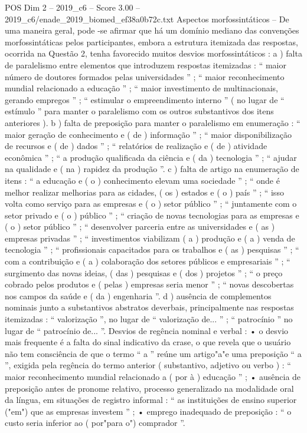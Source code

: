 \begin{textsample}{POS Dim 2 – 2019\_c6 – Score 3.00 – 2019\_c6/enade\_2019\_biomed\_ef38a0b72c.txt}
Aspectos morfossintáticos – De uma maneira geral, pode -se afirmar que há um domínio mediano das convenções morfossintáticas pelos participantes, embora a estrutura itemizada das respostas, ocorrida na Questão 2, tenha favorecido muitos desvios morfossintáticos : a ) falta de paralelismo entre elementos que introduzem respostas itemizadas : “ maior número de doutores formados pelas universidades ” ; “ maior reconhecimento mundial relacionado a educação ” ; “ maior investimento de multinacionais, gerando empregos ” ; “ estimular o empreendimento interno ” ( no lugar de “ estímulo ” para manter o paralelismo com os outros substantivos dos itens anteriores ). b ) falta de preposição para manter o paralelismo em enumeração : “ maior geração de conhecimento e ( de ) informação ” ; “ maior disponibilização de recursos e ( de ) dados ” ; “ relatórios de realização e ( de ) atividade econômica ” ; “ a produção qualificada da ciência e ( da ) tecnologia ” ; “ ajudar na qualidade e ( na ) rapidez da produção ”. c ) falta de artigo na enumeração de itens : “ a educação e ( o ) conhecimento elevam uma sociedade ” ; “ onde é melhor realizar melhorias para as cidades, ( os ) estados e ( o ) país ” ; “ isso volta como serviço para as empresas e ( o ) setor público ” ; “ juntamente com o setor privado e ( o ) público ” ; “ criação de novas tecnologias para as empresas e ( o ) setor público ” ; “ desenvolver parceria entre as universidades e ( as ) empresas privadas ” ; “ investimentos viabilizam ( a ) produção e ( a ) venda de tecnologia ” ; “ profissionais capacitados para os trabalhos e ( as ) pesquisas ” ; “ com a contribuição e ( a ) colaboração dos setores públicos e empresariais ” ; “ surgimento das novas ideias, ( das ) pesquisas e ( dos ) projetos ” ; “ o preço cobrado pelos produtos e ( pelas ) empresas seria menor ” ; “ novas descobertas nos campos da saúde e ( da ) engenharia ”. d ) ausência de complementos nominais junto a substantivos abstratos deverbais, principalmente nas respostas itemizadas : “ valorização ”, no lugar de “ valorização de... ” ; “ patrocínio ” no lugar de “ patrocínio de... ”.
Desvios de regência nominal e verbal : • o desvio mais frequente é a falta do sinal indicativo da crase, o que revela que o usuário não tem consciência de que o termo “ a ” reúne um artigo"a"e uma preposição “ a ”, exigida pela regência do termo anterior ( substantivo, adjetivo ou verbo ) : “ maior reconhecimento mundial relacionado a ( por à ) educação ” ; • ausência de preposição antes de pronome relativo, processo generalizado na modalidade oral da língua, em situações de registro informal : “ as instituições de ensino superior ("em") que as empresas investem ” ; • emprego inadequado de preposição : “ o custo seria inferior ao ( por"para o") comprador ”.

\end{textsample}
